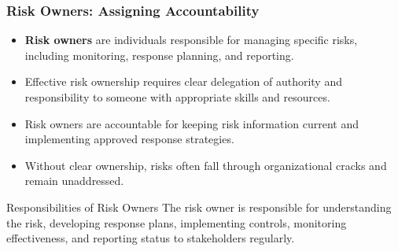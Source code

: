 \documentclass{beamer}
\begin{document}
      \begin{frame}
        \frametitle{Risk Owners: Assigning Accountability}
        \begin{itemize}
          \item \textbf{Risk owners} are individuals responsible for managing specific risks, including monitoring, response planning, and reporting.
          \item Effective risk ownership requires clear delegation of authority and responsibility to someone with appropriate skills and resources.
          \item Risk owners are accountable for keeping risk information current and implementing approved response strategies.
          \item Without clear ownership, risks often fall through organizational cracks and remain unaddressed.
        \end{itemize}
        
        \begin{block}{Responsibilities of Risk Owners}
        The risk owner is responsible for understanding the risk, developing response plans, implementing controls, monitoring effectiveness, and reporting status to stakeholders regularly.
        \end{block}
        \end{frame}
        
\end{document}
